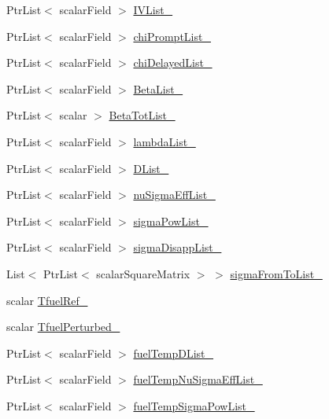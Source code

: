 \begin{DoxyCompactItemize}
\item 
Ptr\+List$<$ scalar\+Field $>$ \hyperlink{classFoam_1_1XSLowMem_a19d53fda58dda9527cd576aeb4bb5d80}{I\+V\+List\+\_\+}
\item 
Ptr\+List$<$ scalar\+Field $>$ \hyperlink{classFoam_1_1XSLowMem_adea7ad629cca35c92aa378f83e83c538}{chi\+Prompt\+List\+\_\+}
\item 
Ptr\+List$<$ scalar\+Field $>$ \hyperlink{classFoam_1_1XSLowMem_a00d7a6e60e7706bef715997006d0ec98}{chi\+Delayed\+List\+\_\+}
\item 
Ptr\+List$<$ scalar\+Field $>$ \hyperlink{classFoam_1_1XSLowMem_ac61f3369da634aa67bc96d748b18926f}{Beta\+List\+\_\+}
\item 
Ptr\+List$<$ scalar $>$ \hyperlink{classFoam_1_1XSLowMem_a7f082da7ac7d2c42560f7c37b1aa00ea}{Beta\+Tot\+List\+\_\+}
\item 
Ptr\+List$<$ scalar\+Field $>$ \hyperlink{classFoam_1_1XSLowMem_a37af06cda2ab5af98b94777e4798a67d}{lambda\+List\+\_\+}
\item 
Ptr\+List$<$ scalar\+Field $>$ \hyperlink{classFoam_1_1XSLowMem_a75affe491d72f7c8f8bfee9646944e7c}{D\+List\+\_\+}
\item 
Ptr\+List$<$ scalar\+Field $>$ \hyperlink{classFoam_1_1XSLowMem_a5ef650c5f31d9ce711fa23fd0e41aa25}{nu\+Sigma\+Eff\+List\+\_\+}
\item 
Ptr\+List$<$ scalar\+Field $>$ \hyperlink{classFoam_1_1XSLowMem_aca36c81fd45ba2181ad6fd4909e23c22}{sigma\+Pow\+List\+\_\+}
\item 
Ptr\+List$<$ scalar\+Field $>$ \hyperlink{classFoam_1_1XSLowMem_a274ed8e7933c604c11f62cf24f2e2235}{sigma\+Disapp\+List\+\_\+}
\item 
List$<$ Ptr\+List$<$ scalar\+Square\+Matrix $>$ $>$ \hyperlink{classFoam_1_1XSLowMem_abee7c68a33baa5d80b71d09034eb2b8e}{sigma\+From\+To\+List\+\_\+}
\item 
scalar \hyperlink{classFoam_1_1XSLowMem_afb9aa7be3330545222d1b55f9c11a305}{Tfuel\+Ref\+\_\+}
\item 
scalar \hyperlink{classFoam_1_1XSLowMem_a0dc5e6d6ef7dce5ab4285edb38ce1950}{Tfuel\+Perturbed\+\_\+}
\item 
Ptr\+List$<$ scalar\+Field $>$ \hyperlink{classFoam_1_1XSLowMem_a89df9893e9de8311c3d836074cebe392}{fuel\+Temp\+D\+List\+\_\+}
\item 
Ptr\+List$<$ scalar\+Field $>$ \hyperlink{classFoam_1_1XSLowMem_a2930058a326b118fe694a0794ae99c29}{fuel\+Temp\+Nu\+Sigma\+Eff\+List\+\_\+}
\item 
Ptr\+List$<$ scalar\+Field $>$ \hyperlink{classFoam_1_1XSLowMem_a714482ef732352d0a87e42fbca21cdbc}{fuel\+Temp\+Sigma\+Pow\+List\+\_\+}

\end{DoxyCompactItemize}
